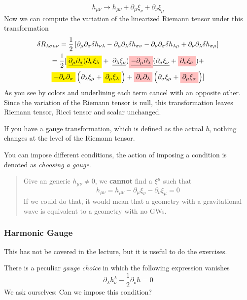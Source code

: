 \[
h_{\mu \nu }\to h_{\mu \nu }+\partial_{\mu }\xi _{\nu }+\partial_{\nu }\xi _{\mu }
\]
Now we can compute the variation of the linearized Riemann tensor under this transformation
\begin{gather*}
	\delta R_{\lambda \sigma \mu \nu } = \frac{1}{2}\left[ \partial_{\mu }\partial_{\sigma }\delta h_{\nu \lambda } - \partial_{\mu }\partial_{\lambda }\delta h_{\sigma \nu } - \partial_{\nu }\partial_{\sigma }\delta h_{\lambda \mu } + \partial_{\nu }\partial_{\lambda }\delta h_{\sigma \mu } \right]\\
	= \frac{1}{2}[ \colorbox{yellow}{\underline{$ \partial_{\mu }\partial_{\sigma }$}$( \partial_{\nu }\xi _{\lambda }$}+ \text{ \underline{$\partial_{\lambda }\xi _{\nu }$}} ) \colorbox{pink}{\underline{$-  \partial_{\mu }\partial_{\lambda }$}}\text{\underline{$( \partial_{\sigma }\xi _{\nu }$}}+ \colorbox{pink}{$ \partial_{\nu }\xi _{\sigma }$}) + \\
	\colorbox{yellow}{$ - \partial_{\nu }\partial_{\sigma }$}\left( \partial_{\lambda }\xi _{\mu }+ \colorbox{yellow}{$ \partial_{\mu }\xi _{\lambda } $}\right) + \colorbox{pink}{$ \partial_{\nu }\partial_{\lambda }$}\left( \partial_{\sigma }\xi _{\mu }+ \colorbox{pink}{$ \partial_{\mu }\xi _{\sigma }$} \right) ] 
\end{gather*}
As you see by colors and underlining each term cancel with an opposite other. Since the variation of the Riemann tensor is null, this transformation leaves Riemann tensor, Ricci tensor and scalar unchanged.\par

If you have a gauge transformation, which is defined as the actual \emph{h}, nothing changes at the level of the Riemann tensor.\par
You can impose different conditions, the action of imposing a condition is denoted as \emph{choosing a gauge}. 
\begin{quote}
Give an generic $h_{\mu \nu } \neq 0$, we \textbf{cannot} find a $\xi ^{\mu }$ such that 
\[
h_{\mu \nu } = h_{\mu \nu } -\partial_{\mu }\xi _{\nu }-\partial_{\nu }\xi _{\mu } = 0
\]
If we could do that, it would mean that a geometry with a gravitational wave is equivalent to a geometry with no GWs.
\end{quote}

\subsubsection{Harmonic Gauge}
This has not be covered in the lecture, but it is useful to do the exercises.\par
There is a peculiar \emph{gauge choice} in which the following expression vanishes
\[
	\partial_{\lambda }h^{\lambda }_{\nu } - \frac{1}{2} \partial_{\nu }h= 0
\]
We ask ourselves: Can we impose this condition?\par

